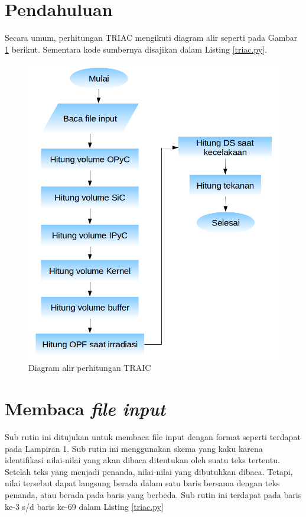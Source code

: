 \documentclass[a4paper,11pt]{report}
\begin{document}
\section{Pendahuluan}
Secara umum, perhitungan TRIAC mengikuti diagram alir seperti pada Gambar \ref{fig:flowchart} berikut. Sementara kode sumbernya disajikan dalam Listing \ref{triac.py}.
\begin{figure}[h]
  \centering
  \includegraphics[scale=.5]{pics/Flowchart.png}
  \caption{Diagram alir perhitungan TRAIC}
  \label{fig:flowchart}
\end{figure}

\vfill
\scriptsize

\normalsize

\section{Membaca \textit{file input}}
Sub rutin ini ditujukan untuk membaca file input dengan format seperti terdapat pada Lampiran 1. Sub rutin ini menggunakan skema yang kaku karena identifikasi nilai-nilai yang akan dibaca ditentukan oleh suatu teks tertentu. Setelah teks yang menjadi penanda, nilai-nilai yang dibutuhkan dibaca. Tetapi, nilai tersebut dapat langsung berada dalam satu baris bersama dengan teks penanda, atau berada pada baris yang berbeda. Sub rutin ini terdapat pada baris ke-3 s/d baris ke-69 dalam Listing \ref{triac.py}
\end{document}
